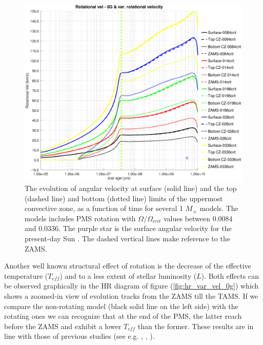 \documentclass[fleqn,usenatbib]{mnras}
\begin{document}
\begin{figure}
	\includegraphics[trim = 30mm 15mm 20mm 15mm, clip,width=\columnwidth]{figures/rot_vel_var_vel_0_0g.eps}
    \caption{The evolution of angular velocity at surface (solid line) and the top (dashed line) and bottom (dotted line) limits of the uppermost convective zone, as a function of time for several 1 $M_{\sun}$ models. The models includes PMS rotation with $\Omega / \Omega_{crit}$ values between 0.0084 and 0.0336. The purple star is the surface angular velocity for the present-day Sun \citep{Gill2012}. The dashed vertical lines make reference to the ZAMS.}
    \label{fig:rot_vel_0g}
\end{figure}

Another well known structural effect of rotation is the decrease of the effective temperature ($T_{eff}$) and to a less extent of stellar luminosity ($L$). Both effects can be observed graphically in the HR diagram of figure (\ref{fig:hr_var_vel_0g}) which shows a zoomed-in view of evolution tracks from the ZAMS till the TAMS. If we compare the non-rotating model (black solid line on the left side) with the rotating ones we can recognize that at the end of the PMS, the latter reach before the ZAMS and exhibit a lower $T_{eff}$ than the former. These results are in line with those of previous studies (see e.g. \citet{Eggenberger2012}, \citet{Piau2001}, \citet{Pinsonneault1989}).\par
\end{document}
